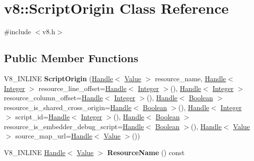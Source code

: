 \hypertarget{classv8_1_1_script_origin}{}\section{v8\+:\+:Script\+Origin Class Reference}
\label{classv8_1_1_script_origin}


{\ttfamily \#include $<$v8.\+h$>$}

\subsection*{Public Member Functions}
\begin{DoxyCompactItemize}
\item 
\hypertarget{classv8_1_1_script_origin_a57b8c19d5dc8e3dc2d16774c607c48d5}{}V8\+\_\+\+I\+N\+L\+I\+N\+E {\bfseries Script\+Origin} (\hyperlink{classv8_1_1_local}{Handle}$<$ \hyperlink{classv8_1_1_value}{Value} $>$ resource\+\_\+name, \hyperlink{classv8_1_1_local}{Handle}$<$ \hyperlink{classv8_1_1_integer}{Integer} $>$ resource\+\_\+line\+\_\+offset=\hyperlink{classv8_1_1_local}{Handle}$<$ \hyperlink{classv8_1_1_integer}{Integer} $>$(), \hyperlink{classv8_1_1_local}{Handle}$<$ \hyperlink{classv8_1_1_integer}{Integer} $>$ resource\+\_\+column\+\_\+offset=\hyperlink{classv8_1_1_local}{Handle}$<$ \hyperlink{classv8_1_1_integer}{Integer} $>$(), \hyperlink{classv8_1_1_local}{Handle}$<$ \hyperlink{classv8_1_1_boolean}{Boolean} $>$ resource\+\_\+is\+\_\+shared\+\_\+cross\+\_\+origin=\hyperlink{classv8_1_1_local}{Handle}$<$ \hyperlink{classv8_1_1_boolean}{Boolean} $>$(), \hyperlink{classv8_1_1_local}{Handle}$<$ \hyperlink{classv8_1_1_integer}{Integer} $>$ script\+\_\+id=\hyperlink{classv8_1_1_local}{Handle}$<$ \hyperlink{classv8_1_1_integer}{Integer} $>$(), \hyperlink{classv8_1_1_local}{Handle}$<$ \hyperlink{classv8_1_1_boolean}{Boolean} $>$ resource\+\_\+is\+\_\+embedder\+\_\+debug\+\_\+script=\hyperlink{classv8_1_1_local}{Handle}$<$ \hyperlink{classv8_1_1_boolean}{Boolean} $>$(), \hyperlink{classv8_1_1_local}{Handle}$<$ \hyperlink{classv8_1_1_value}{Value} $>$ source\+\_\+map\+\_\+url=\hyperlink{classv8_1_1_local}{Handle}$<$ \hyperlink{classv8_1_1_value}{Value} $>$())\label{classv8_1_1_script_origin_a57b8c19d5dc8e3dc2d16774c607c48d5}

\item 
\hypertarget{classv8_1_1_script_origin_a289502d71720ca10e53b4a32d9226f58}{}V8\+\_\+\+I\+N\+L\+I\+N\+E \hyperlink{classv8_1_1_local}{Handle}$<$ \hyperlink{classv8_1_1_value}{Value} $>$ {\bfseries Resource\+Name} () const \label{classv8_1_1_script_origin_a289502d71720ca10e53b4a32d9226f58}


\end{DoxyCompactItemize}
